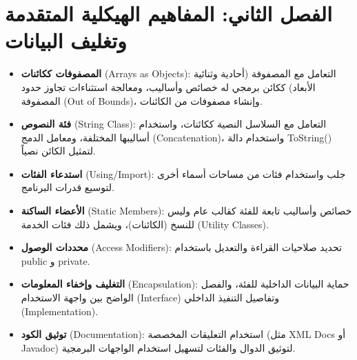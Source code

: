 \documentclass[14pt]{extarticle}
\begin{document}
\section{الفصل الثاني: المفاهيم الهيكلية المتقدمة وتغليف البيانات}

\begin{itemize}[itemsep=5pt]
    \item \textbf{المصفوفات ككائنات} (\textenglish{Arrays as Objects}): التعامل مع المصفوفة (أحادية وثنائية الأبعاد) ككائن برمجي له خصائص وأساليب، ومعالجة استثناءات تجاوز حدود المصفوفة (\textenglish{Out of Bounds})، وإنشاء مصفوفات من الكائنات.
    \item \textbf{فئة النصوص} (\textenglish{String Class}): التعامل مع السلاسل النصية ككائنات، واستخدام أساليبها المختلفة، ومعامل الدمج (\textenglish{Concatenation})، واستخدام دالة \textenglish{ToString()} لتمثيل الكائن نصياً.
    \item \textbf{استدعاء الفئات} (\textenglish{Using/Import}): جلب واستخدام فئات من مساحات أسماء أخرى لتوسيع قدرات البرنامج.
    \item \textbf{الأعضاء الساكنة} (\textenglish{Static Members}): خصائص وأساليب تابعة للفئة كقالب عام وليس للنسخ (الكائنات)، ويشمل ذلك فئات الخدمة (\textenglish{Utility Classes}).
    \item \textbf{محددات الوصول} (\textenglish{Access Modifiers}): تحديد صلاحيات القراءة والتعديل باستخدام \textenglish{public} و \textenglish{private}.
    \item \textbf{التغليف وإخفاء المعلومات} (\textenglish{Encapsulation}): حماية البيانات الداخلية للفئة، والفصل الواضح بين واجهة الاستخدام (\textenglish{Interface}) وتفاصيل التنفيذ الداخلي (\textenglish{Implementation}).
    \item \textbf{توثيق الكود} (\textenglish{Documentation}): استخدام التعليقات المخصصة (مثل \textenglish{XML Docs} أو \textenglish{Javadoc}) لتوثيق الدوال والفئات لتسهيل استخدام الواجهات البرمجية.
\end{itemize}
\end{document}
